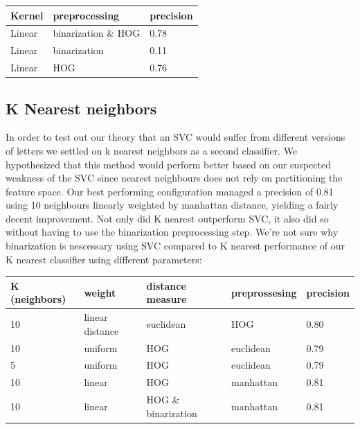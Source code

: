 \documentclass[paper=a4, fontsize=11pt]{scrartcl} %
\numberwithin{equation}{section} %
\numberwithin{figure}{section} %
\numberwithin{table}{section} %
\begin{document}
\begin{tabular}{l | l | l}
    Kernel & preprocessing & precision\\ \hline
    Linear & binarization \& HOG & 0.78 \\ \hline
    Linear & binarization & 0.11 \\ \hline
    Linear & HOG & 0.76\\ \hline
\end{tabular}

\subsection{K Nearest neighbors}
In order to test out our theory that an SVC would suffer from
different versions of letters we settled on k nearest neighbors as a
second classifier.  We hypothesized that this method would perform
better based on our suspected weakness of the SVC since nearest
neighbours does not rely on partitioning the feature space.  Our best
performing configuration managed a precision of 0.81 using 10
neighbours linearly weighted by manhattan distance, yielding a fairly
decent improvement.  Not only did K nearest outperform SVC, it also
did so without having to use the binarization preprocessing step.
We're not sure why binarization is nescessary using SVC compared to K
nearest %
performance of our K nearest classifier using different parameters:
\begin{tabular}{l | l | l | l | l}
    K (neighbors) & weight & distance measure & preprossesing & precision\\ \hline
    10 & linear distance & euclidean & HOG & 0.80\\ \hline
    10 & uniform & HOG & euclidean & 0.79\\ \hline
    5 & uniform & HOG & euclidean & 0.79\\ \hline
    10 & linear & HOG & manhattan & 0.81\\ \hline
    10 & linear & HOG \& binarization & manhattan & 0.81\\ \hline
\end{tabular}
    

 
\end{document}
